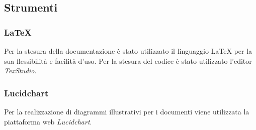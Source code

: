 \documentclass[./../NormediProgetto.tex]{subfiles}
\begin{document}
\subsection{Strumenti}

\subsubsection{\LaTeX{}}

Per la stesura della documentazione è stato utilizzato il linguaggio \LaTeX{} per la sua flessibilità e facilità d'uso.
Per la stesura del codice è stato utilizzato l’editor \textit{TexStudio}.

\subsubsection{Lucidchart}

Per la realizzazione di diagrammi illustrativi per i documenti viene utilizzata la piattaforma web \textit{Lucidchart}.
\end{document}
